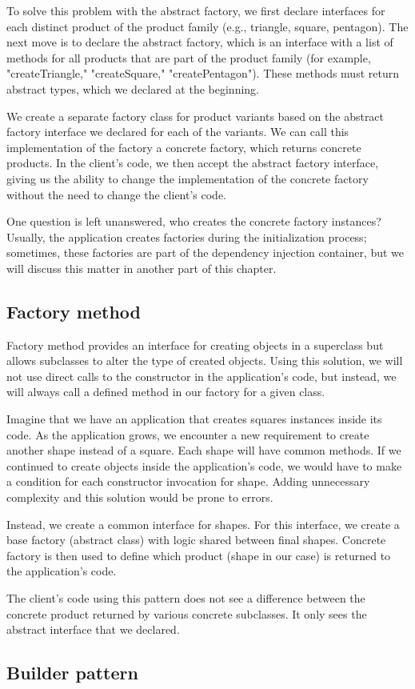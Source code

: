 To solve this problem with the abstract factory, we first declare interfaces for each distinct product of
the product family (e.g., triangle, square, pentagon). The next move is to declare the abstract factory, which is an interface with
a list of methods for all products that are part of the product family (for example, "createTriangle," "createSquare," "createPentagon").
These methods must return abstract types, which we declared at the beginning.

We create a separate factory class for product variants based on the abstract factory interface we declared for each of the variants.
We can call this implementation of the factory a concrete factory, which returns concrete products. In the client's code, we then accept the abstract
factory interface, giving us the ability to change the implementation of the concrete factory without the need to change the client's code.

One question is left unanswered, who creates the concrete factory instances? Usually, the application creates factories during
the initialization process; sometimes, these factories are part of the dependency injection container, but we will discuss this matter in another part of this chapter.

\subsection{Factory method}

Factory method provides an interface for creating objects in a superclass but allows subclasses to alter the type of created objects.
\cite{noauthor_factory_nodate} Using this solution, we will not use direct calls to the constructor in the application's code, but instead,
we will always call a defined method in our factory for a given class.

Imagine that we have an application that creates squares instances inside its code. As the application grows,
we encounter a new requirement to create another shape instead of a square. Each shape will have common methods.
If we continued to create objects inside the application's code, we would have to make a condition for each constructor invocation for shape.
Adding unnecessary complexity and this solution would be prone to errors.

Instead, we create a common interface for shapes. For this interface, we create a base factory (abstract class) with logic shared between final shapes.
Concrete factory is then used to define which product (shape in our case) is returned to the application's code.

The client's code using this pattern does not see a difference between the concrete product returned by various concrete subclasses.
It only sees the abstract interface that we declared.

\subsection{Builder pattern}